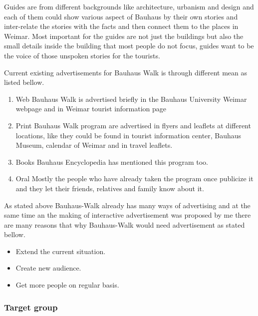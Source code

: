 Guides are from different backgrounds like architecture, urbanism and design and each of them could show various aspect of Bauhaus by their own stories and inter-relate the stories with the facts and then connect them to the places in Weimar. Most important for the guides are not just the buildings but also the small details inside the building that most people do not focus, guides want to be the voice of those unspoken stories for the tourists.

Current existing advertisements for Bauhaus Walk is through different mean as listed bellow.

\begin {enumerate}

\item	Web
Bauhaus Walk is advertised briefly in the Bauhaus University Weimar webpage \cite{Tourist_info} and in Weimar tourist information page \cite{Bauhaus_Walk_Uni}

\item	Print
Bauhaus Walk program are advertised in flyers and leaflets at different locations, like they could be found in tourist information center, Bauhaus Museum, calendar of Weimar and in travel leaflets. 

\item	Books
Bauhaus Encyclopedia has mentioned this program too. 

\item	Oral
Mostly the people who have already taken the program once publicize it and they let their friends, relatives and family know about it.


\end{enumerate}

As stated above Bauhaus-Walk already has many ways of advertising and at the same time an the making of interactive advertisement was proposed by me there are many reasons that why Bauhaus-Walk would need advertisement as stated bellow.


\begin {itemize}
\item   Extend the current situation.
\item	Create new audience.
\item	Get more people on regular basis.
\end{itemize}


\subsubsection{Target group}

